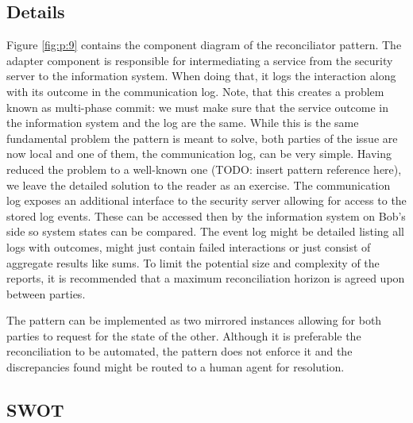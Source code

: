 \documentclass[10pt,a4paper]{article}
\begin{document}
\subsection{Details}
Figure \ref{fig:p:9} contains the component diagram of the reconciliator pattern. The adapter component is responsible for intermediating a service from the security server to the information system. When doing that, it logs the interaction along with its outcome in the communication log. Note, that this creates a problem known as multi-phase commit: we must make sure that the service outcome in the information system and the log are the same. While this is the same fundamental problem the pattern is meant to solve, both parties of the issue are now local and one of them, the communication log, can be very simple. Having reduced the problem to a well-known one (TODO: insert pattern reference here), we leave the detailed solution to the reader as an exercise. The communication log exposes an additional interface to the security server allowing for access to the stored log events. These can be accessed then by the information system on Bob's side so system states can be compared. The event log might be detailed listing all logs with outcomes, might just contain failed interactions or just consist of aggregate results like sums. To limit the potential size and complexity of the reports, it is recommended that a maximum reconciliation horizon is agreed upon between parties.

The pattern can be implemented as two mirrored instances allowing for both parties to request for the state of the other. Although it is preferable the reconciliation to be automated, the pattern does not enforce it and the discrepancies found might be routed to a human agent for resolution.

\subsection{SWOT}
\end{document}
